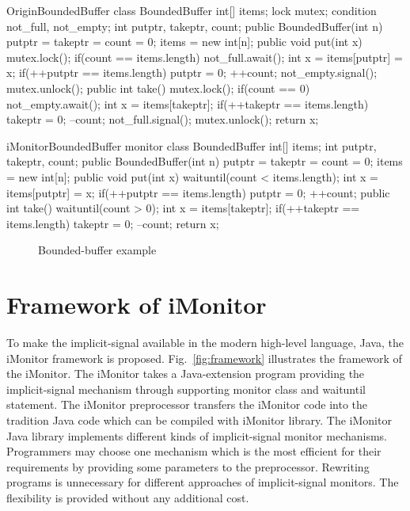 \documentclass[preprint]{sigplanconf}
\begin{document}
\begin{SaveVerbatim}{OriginBoundedBuffer}
class BoundedBuffer {
  int[] items;  
  lock mutex;
  condition not_full, not_empty;
  int putptr, takeptr, count;
  public BoundedBuffer(int n) {
    putptr = takeptr = count = 0;
    items = new int[n];
  } 
  public void put(int x) {
    mutex.lock();
    if(count == items.length) {
      not_full.await();
    }
    int x = items[putptr] = x;
    if(++putptr == items.length) {
      putptr = 0;
    }
    ++count;
    not_empty.signal();
    mutex.unlock();
  }
  public int take() {
    mutex.lock();
    if(count == 0) {
      not_empty.await();
    }
    int x = items[takeptr];
    if(++takeptr == items.length) {
      takeptr = 0;
    }
    --count;
    not_full.signal();
    mutex.unlock();
    return x;
  }
}
\end{SaveVerbatim}

\begin{SaveVerbatim}{iMonitorBoundedBuffer}
monitor class BoundedBuffer { 
  int[] items; 
  int putptr, takeptr, count; 
  public BoundedBuffer(int n) { 
    putptr = takeptr = count = 0; 
    items = new int[n]; 
  } 
  public void put(int x) { 
    waituntil(count < items.length); 
    int x = items[putptr] = x; 
    if(++putptr == items.length) { 
      putptr = 0; 
    } 
    ++count; 
  } 
  public int take() { 
    waituntil(count > 0); 
    int x = items[takeptr]; 
    if(++takeptr == items.length) { 
      takeptr = 0; 
    }
    --count;
    return x;
  }
}
\end{SaveVerbatim}

\begin{figure}
  \centering
  \caption{Bounded-buffer example}
  \label{fig:bb_exp}
\end{figure}

\section{Framework of iMonitor} \label{sec:fw}
To make the implicit-signal available in the modern high-level language, Java, 
the iMonitor framework is proposed. Fig.~\ref{fig:framework} illustrates the 
framework of the iMonitor. The iMonitor takes a Java-extension program providing
the implicit-signal mechanism through supporting monitor class and waituntil 
statement. The iMonitor preprocessor transfers the iMonitor code into the 
tradition Java code which can be compiled with iMonitor library. The iMonitor 
Java library implements different kinds of implicit-signal monitor mechanisms. 
Programmers may choose one mechanism which is the most efficient for their 
requirements by providing some parameters to the preprocessor. Rewriting 
programs is unnecessary for different approaches of implicit-signal monitors. 
The flexibility is provided without any additional cost. 
\end{document}
